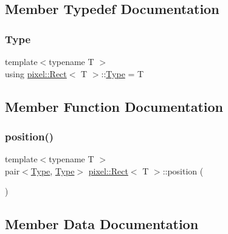 \subsection{Member Typedef Documentation}
\mbox{\label{classpixel_1_1_rect_a7890b7a80decee4efccf587d4f5b13d7}} 
\subsubsection{\texorpdfstring{Type}{Type}}
{\footnotesize\ttfamily template$<$typename T $>$ \\
using \hyperlink{classpixel_1_1_rect}{pixel\+::\+Rect}$<$ T $>$\+::\hyperlink{classpixel_1_1_rect_a7890b7a80decee4efccf587d4f5b13d7}{Type} =  T}



\subsection{Member Function Documentation}
\mbox{\label{classpixel_1_1_rect_a0c7a21247e59915c90c3dfec87bdfd06}} 
\subsubsection{\texorpdfstring{position()}{position()}}
{\footnotesize\ttfamily template$<$typename T $>$ \\
pair$<$\hyperlink{classpixel_1_1_rect_a7890b7a80decee4efccf587d4f5b13d7}{Type}, \hyperlink{classpixel_1_1_rect_a7890b7a80decee4efccf587d4f5b13d7}{Type}$>$ \hyperlink{classpixel_1_1_rect}{pixel\+::\+Rect}$<$ T $>$\+::position (\begin{DoxyParamCaption}{ }\end{DoxyParamCaption})\hspace{0.3cm}{\ttfamily [inline]}}



\subsection{Member Data Documentation}
\mbox{\label{classpixel_1_1_rect_a8e6880af060867afddd02408703cd03b}} 
